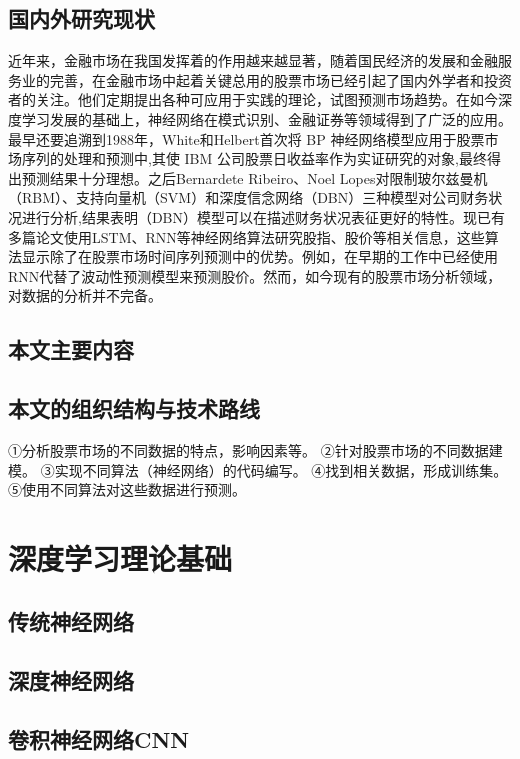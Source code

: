 \documentclass[UTF8]{ctexart}
\begin{document}
\subsection{国内外研究现状}
近年来，金融市场在我国发挥着的作用越来越显著，随着国民经济的发展和金融服务业的完善，在金融市场中起着关键总用的股票市场已经引起了国内外学者和投资者的关注。他们定期提出各种可应用于实践的理论，试图预测市场趋势\cite{Lahmiri2015,Chiang2015,Seddon2017,Zhou2016,Ichinose2018}。在如今深度学习发展的基础上\cite{Gers2002,Hinton2006,Jiang2018,Kim2015,Kuremoto2014,Torres2017}，神经网络在模式识别、金融证券等领域得到了广泛的应用。最早还要追溯到1988年，White和Helbert首次将 BP 神经网络模型应用于股票市场序列的处理和预测中,其使 IBM 公司股票日收益率作为实证研究的对象,最终得出预测结果十分理想\cite{White1988}。之后Bernardete Ribeiro、Noel Lopes对限制玻尔兹曼机（RBM）、支持向量机（SVM）和深度信念网络（DBN）三种模型对公司财务状况进行分析,结果表明（DBN）模型可以在描述财务状况表征更好的特性\cite{Ribeiro2011}。现已有多篇论文使用LSTM、RNN等神经网络算法研究股指、股价等相关信息\cite{Pang2018,Chong2017,Bao2017,Chen2015,Fischer2018,Hsieh2011,Huynh2017,Liu2017}，这些算法显示除了在股票市场时间序列预测中的优势。例如，在早期的工作中\cite{Kamijo1990}已经使用RNN代替了波动性预测模型来预测股价。然而，如今现有的股票市场分析领域，对数据的分析并不完备。
\subsection{本文主要内容}

\subsection{本文的组织结构与技术路线}
①分析股票市场的不同数据的特点，影响因素等。
②针对股票市场的不同数据建模。
③实现不同算法（神经网络）的代码编写。
④找到相关数据，形成训练集。
⑤使用不同算法对这些数据进行预测。
\section{深度学习理论基础}
\subsection{传统神经网络}
\subsection{深度神经网络}
\subsection{卷积神经网络CNN}
\end{document}
